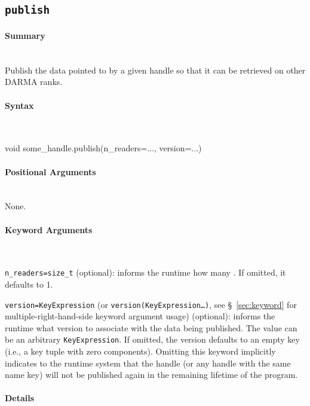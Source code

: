 \subsection{\texttt{publish}}
\label{ssec:api_fe_publish}

\paragraph{Summary} \mbox{}\\
Publish the data pointed to by a given handle so that it can be retrieved on 
other DARMA ranks.

\paragraph{Syntax} \mbox{}\\
\begin{CppCode}
void some_handle.publish(n_readers=..., version=...)
\end{CppCode}

\paragraph{Positional Arguments} \mbox{}\\
None.

\paragraph{Keyword Arguments} \mbox{}\\
\begin{compactitem}
\item \texttt{n\_readers=size\_t} (optional): informs the runtime how many . If
omitted, it defaults to 1.
\item \texttt{version=KeyExpression} (or \texttt{version(KeyExpression\ldots)},
see \S~\ref{sec:keyword} for multiple-right-hand-side keyword argument usage)
(optional):
informs the runtime what version to associate with the data being published. 
The value can be an arbitrary \texttt{KeyExpression}.
If omitted, the version defaults to an empty key (i.e., a key tuple with zero 
components).  Omitting this keyword implicitly indicates to the runtime system
that the handle (or any handle with the same name key) will not be published
again in the remaining lifetime of the program.
\end{compactitem}

\paragraph{Details} \mbox{}\\

